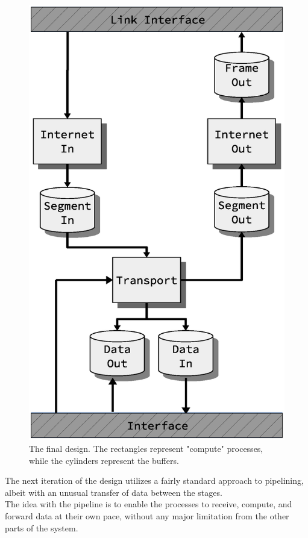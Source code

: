 \begin{figure}
    \includegraphics[scale=0.45]{design/design_2.eps}
    \caption{The final design. The rectangles represent "compute" processes,
while the cylinders represent the buffers.}
    \label{fig:final_design}
\end{figure}

The next iteration of the design utilizes a fairly standard approach to
pipelining, albeit with an unusual transfer of data between the stages.\\
The idea with the pipeline is to enable the processes to receive, compute, and
forward data at their own pace, without any major limitation from the other
parts of the system.

